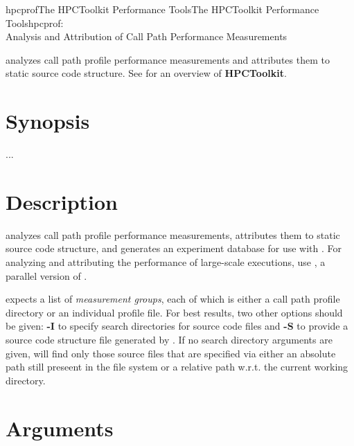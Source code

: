 \documentclass[english]{article}
\begin{document}
\begin{Name}{1}{hpcprof}{The HPCToolkit Performance Tools}{The HPCToolkit Performance Tools}{hpcprof:\\ Analysis and Attribution of Call Path Performance Measurements}

 analyzes call path profile performance measurements
and attributes them to static source code structure.
See  for an overview of \textbf{HPCToolkit}.

\end{Name}

\section{Synopsis}

  ...

\section{Description}

 analyzes call path profile performance measurements,
attributes them to static source code structure,
and generates an experiment database for use with .
For analyzing and attributing the performance of large-scale executions,
use , a parallel version of .

 expects a list of \emph{measurement groups},
each of which is either a call path profile directory or an individual profile file.
For best results, two other options should be given:
\textbf{-I} to specify search directories for source code files
and \textbf{-S} to provide a source code structure file generated by .
If no search directory arguments are given,
 will find only those source files that are specified via
either an absolute path still preseent in the file system
or a relative path w.r.t. the current working directory.


\section{Arguments}
\end{document}
